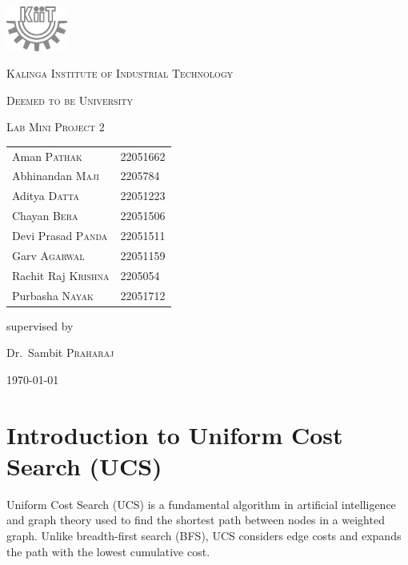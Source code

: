 \documentclass[final, journal, 11pt]{article}
\begin{document}
	
	\begin{titlepage}
		\centering
		\includegraphics[width=0.15\textwidth]{./assets/bw_kiit.png}\par\vspace{1cm}
		{\LARGE \textsc{Kalinga Institute of Industrial Technology}\par}
		{\textsc{Deemed to be University}\par}
		\vspace{1cm}
		{\Large \textsc{Lab Mini Project 2}\par}
		\vspace{1.5cm}
		{\huge{}\par}
		\vspace{1cm}
		\begin{tabular}{ll}
			Aman \textsc{Pathak}       & 22051662 \\	
			Abhinandan \textsc{Maji}   & 2205784  \\
			Aditya \textsc{Datta}      & 22051223 \\
			Chayan \textsc{Bera}       & 22051506 \\
			Devi Prasad \textsc{Panda} & 22051511 \\
			Garv \textsc{Agarwal}      & 22051159 \\
			Rachit Raj \textsc{Krishna} & 2205054  \\
			Purbasha \textsc{Nayak}    & 22051712 \\
		\end{tabular}
		\vspace{0.5cm}					
		\vfill
		supervised by\par
		Dr.~Sambit \textsc{Praharaj}
		
		\vfill
		
		{\large \today\par}
	\end{titlepage}
	
	\section{Introduction to Uniform Cost Search (UCS)}
	Uniform Cost Search (UCS) is a fundamental algorithm in artificial intelligence and graph theory used to find the shortest path between nodes in a weighted graph. Unlike breadth-first search (BFS), UCS considers edge costs and expands the path with the lowest cumulative cost.
	
\end{document}
